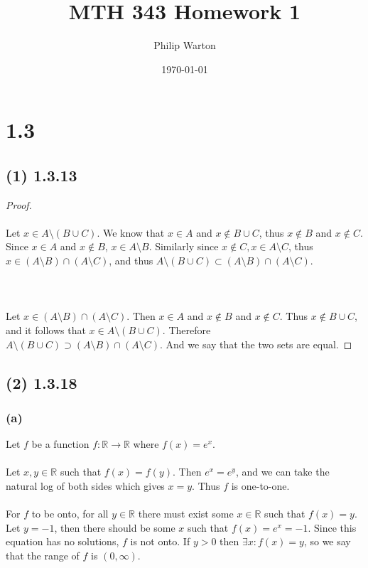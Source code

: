 \documentclass{article}
\begin{document}
\title{MTH 343 Homework 1}
\author{Philip Warton}
\date{\today}
\maketitle

\section*{1.3}
\subsection*{(1) 1.3.13}
\begin{proof}
    \\\\
    Let $x \in A \setminus (B \cup C)$.
    We know that $x \in A$ and $x \notin B \cup C$, thus $x \notin B$ and $x \notin C$.
    Since $x \in A$ and $x \notin B$, $x \in A \setminus B$.
    Similarly since $x \notin C, x \in A \setminus C$, thus $x \in (A \setminus B) \cap (A \setminus C)$, and thus $A \setminus (B \cup C) \subset (A \setminus B) \cap (A \setminus C)$.
    \\\\
    \\\\
    Let $x \in (A \setminus B) \cap (A \setminus C)$.
    Then $x \in A$ and $x \notin B$ and $x \notin C$. Thus $x \notin B \cup C$, and it follows that $x \in A \setminus (B \cup C)$.
    Therefore $A \setminus (B \cup C) \supset (A \setminus B) \cap (A \setminus C)$.
    And we say that the two sets are equal.
\end{proof}

\subsection*{(2) 1.3.18}
\subsubsection*{(a)}
Let $f$ be a function $f : \mathbb{R} \rightarrow \mathbb{R}$ where $f(x) = e^x$.
\\\\
Let $x, y \in \mathbb{R}$ such that $f(x) = f(y)$.
Then $e^x = e^y$, and we can take the natural log of both sides which gives $x = y$.
Thus $f$ is one-to-one.
\\\\
For $f$ to be onto, for all $y \in \mathbb{R}$ there must exist some $x \in \mathbb{R}$ such that $f(x) = y$.
Let $y = -1$, then there should be some $x$ such that $f(x) = e^x = -1$.
Since this equation has no solutions, $f$ is not onto.
If $y > 0$ then $\exists x : f(x) = y$, so we say that the range of $f$ is $(0, \infty)$.
\end{document}
